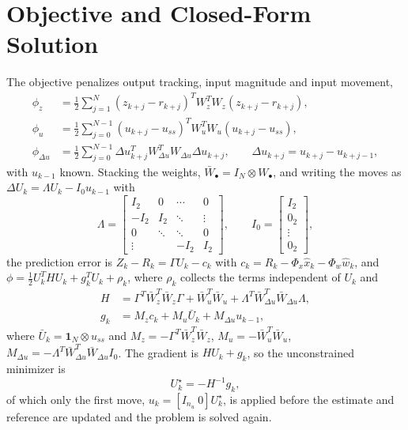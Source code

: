 \section{Objective and Closed-Form Solution}
\label{sec:p8-objective}

The objective penalizes output tracking, input magnitude and input movement,
\begin{align}
 \phi_z&=\frac12\sum_{j=1}^{N}
  (z_{k+j}-r_{k+j})^T W_z^T W_z (z_{k+j}-r_{k+j}),
 \label{eq:p8-phiz}\\
 \phi_u&=\frac12\sum_{j=0}^{N-1}
  (u_{k+j}-u_{ss})^T W_u^T W_u (u_{k+j}-u_{ss}),
 \label{eq:p8-phiu}\\
 \phi_{\Delta u}&=\frac12\sum_{j=0}^{N-1}
  \Delta u_{k+j}^T W_{\Delta u}^T W_{\Delta u}\Delta u_{k+j},
 \qquad
 \Delta u_{k+j}=u_{k+j}-u_{k+j-1},
 \label{eq:p8-phidu}
\end{align}
with $u_{k-1}$ known. Stacking the weights, $\bar W_\bullet=I_N\otimes W_\bullet$,
and writing the moves as $\Delta U_k=\Lambda U_k-I_0u_{k-1}$ with
\begin{equation}
 \Lambda=
 \begin{bmatrix}
  I_2 & 0 & \cdots & 0\\
  -I_2 & I_2 & \ddots & \vdots\\
  0 & \ddots & \ddots & 0\\
  \vdots & & -I_2 & I_2
 \end{bmatrix},
 \qquad
 I_0=\begin{bmatrix}I_2\\ 0_2\\ \vdots\\ 0_2\end{bmatrix},
 \label{eq:p8-lambda-i0}
\end{equation}
the prediction error is $Z_k-R_k=\Gamma U_k-c_k$ with
$c_k=R_k-\Phi_x\hat x_k-\Phi_w\hat w_k$, and $\phi=\frac12U_k^THU_k+g_k^TU_k+\rho_k$,
where $\rho_k$ collects the terms independent of $U_k$ and
\begin{align}
 H&=\Gamma^T\bar W_z^T\bar W_z\Gamma
   +\bar W_u^T\bar W_u
   +\Lambda^T\bar W_{\Delta u}^T\bar W_{\Delta u}\Lambda,
 \label{eq:p8-H}\\
 g_k&=M_zc_k+M_u\bar U_k+M_{\Delta u}u_{k-1},
 \label{eq:p8-g}
\end{align}
where $\bar U_k=\mathbf{1}_N\otimes u_{ss}$ and
$M_z=-\Gamma^T\bar W_z^T\bar W_z$, $M_u=-\bar W_u^T\bar W_u$,
$M_{\Delta u}=-\Lambda^T\bar W_{\Delta u}^T\bar W_{\Delta u}I_0$. The gradient is
$HU_k+g_k$, so the unconstrained minimizer is
\begin{equation}
 U_k^\star=-H^{-1}g_k,
 \label{eq:p8-solution}
\end{equation}
of which only the first move,
$u_k=[I_{n_u}\ 0]U_k^\star$, is applied before the estimate and reference are
updated and the problem is solved again.

